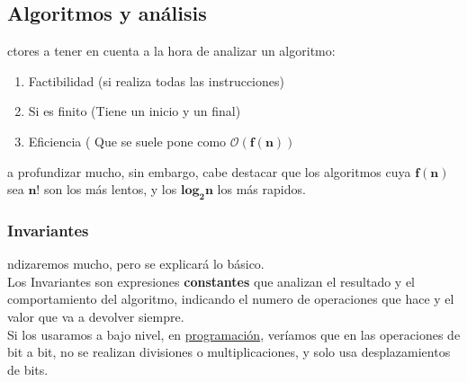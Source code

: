 \subsection{Algoritmos y análisis}
ctores a tener en cuenta a la hora de analizar un algoritmo:
\begin{enumerate}
        \item Factibilidad (si realiza todas las instrucciones)
        \item Si es finito (Tiene un inicio y un final)
        \item Eficiencia ( Que se suele pone como \(\mathbf{\mathcal{O}(f(n))}\)
\end{enumerate}
 a profundizar mucho, sin embargo, cabe destacar que los algoritmos cuya \(\mathbf{f(n)}\) sea \(\mathbf{n!}\) son los más lentos, y los \(\mathbf{log_{2}{n}}\) los más rapidos.
\subsubsection{Invariantes}
ndizaremos mucho, pero se explicará lo básico.\\ Los Invariantes son expresiones \textbf{constantes} que analizan el resultado y el comportamiento del algoritmo, indicando el numero de operaciones que hace y el valor que va a devolver siempre.\\ Si los usaramos a bajo nivel, en \underline{programación}, veríamos que en las operaciones de bit a bit, no se realizan divisiones o multiplicaciones, y solo usa desplazamientos de bits.
